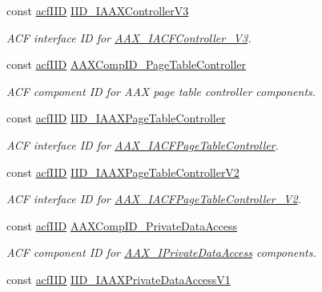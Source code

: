 \begin{Indent}
\begin{DoxyCompactItemize}
const \mbox{\hyperlink{a00269_a59df0b41744eee7a066787aaedf97f67}{acf\+I\+ID}} \mbox{\hyperlink{a00683_ab493d5302acb8e87ac9ba19d0baa92d2}{I\+I\+D\+\_\+\+I\+A\+A\+X\+Controller\+V3}}
\begin{DoxyCompactList}\small\item\em A\+CF interface ID for \mbox{\hyperlink{a01645}{A\+A\+X\+\_\+\+I\+A\+C\+F\+Controller\+\_\+\+V3}}. \end{DoxyCompactList}\item 
const \mbox{\hyperlink{a00269_a59df0b41744eee7a066787aaedf97f67}{acf\+I\+ID}} \mbox{\hyperlink{a00683_afbda44f63aecda768b6935e79226ce63}{A\+A\+X\+Comp\+I\+D\+\_\+\+Page\+Table\+Controller}}
\begin{DoxyCompactList}\small\item\em A\+CF component ID for A\+AX page table controller components. \end{DoxyCompactList}\item 
const \mbox{\hyperlink{a00269_a59df0b41744eee7a066787aaedf97f67}{acf\+I\+ID}} \mbox{\hyperlink{a00683_a0bbba7e8b6a99bb68d2edcf4c1c06b44}{I\+I\+D\+\_\+\+I\+A\+A\+X\+Page\+Table\+Controller}}
\begin{DoxyCompactList}\small\item\em A\+CF interface ID for \mbox{\hyperlink{a01733}{A\+A\+X\+\_\+\+I\+A\+C\+F\+Page\+Table\+Controller}}. \end{DoxyCompactList}\item 
const \mbox{\hyperlink{a00269_a59df0b41744eee7a066787aaedf97f67}{acf\+I\+ID}} \mbox{\hyperlink{a00683_aa7c11e4b5a6663039359831c0869c0a7}{I\+I\+D\+\_\+\+I\+A\+A\+X\+Page\+Table\+Controller\+V2}}
\begin{DoxyCompactList}\small\item\em A\+CF interface ID for \mbox{\hyperlink{a01737}{A\+A\+X\+\_\+\+I\+A\+C\+F\+Page\+Table\+Controller\+\_\+\+V2}}. \end{DoxyCompactList}\item 
const \mbox{\hyperlink{a00269_a59df0b41744eee7a066787aaedf97f67}{acf\+I\+ID}} \mbox{\hyperlink{a00683_a4d947cbe546fdaa1397264c47ddb96d2}{A\+A\+X\+Comp\+I\+D\+\_\+\+Private\+Data\+Access}}
\begin{DoxyCompactList}\small\item\em A\+CF component ID for \mbox{\hyperlink{a01865}{A\+A\+X\+\_\+\+I\+Private\+Data\+Access}} components. \end{DoxyCompactList}\item 
const \mbox{\hyperlink{a00269_a59df0b41744eee7a066787aaedf97f67}{acf\+I\+ID}} \mbox{\hyperlink{a00683_aa501391f1c951a2cf295dadfea936a49}{I\+I\+D\+\_\+\+I\+A\+A\+X\+Private\+Data\+Access\+V1}}

\end{DoxyCompactItemize}
\end{Indent}
